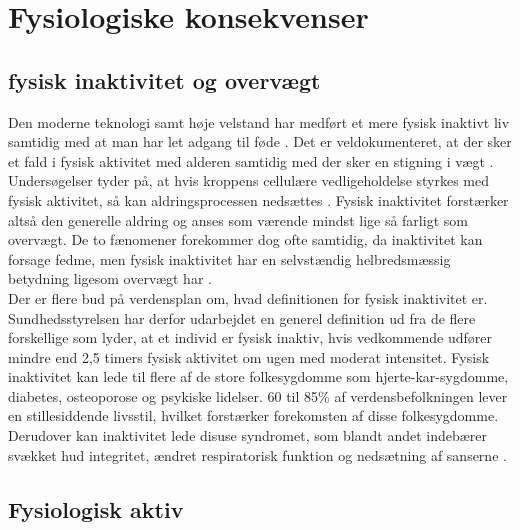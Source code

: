 \section{Fysiologiske konsekvenser}


\subsection{fysisk inaktivitet og overvægt}
Den moderne teknologi samt høje velstand har medført et mere fysisk inaktivt liv samtidig med at man har let adgang til føde \cite{Kiens2007}. Det er veldokumenteret, at der sker et fald i fysisk aktivitet med alderen samtidig med der sker en stigning i vægt \cite{Kaprio2008}. Undersøgelser tyder på, at hvis kroppens cellulære vedligeholdelse styrkes med fysisk aktivitet, så kan aldringsprocessen nedsættes \cite{Knight2012}. Fysisk inaktivitet forstærker altså den generelle aldring og anses som værende mindst lige så farligt som overvægt. De to fænomener forekommer dog ofte samtidig, da inaktivitet kan forsage fedme, men fysisk inaktivitet har en selvstændig helbredsmæssig betydning ligesom overvægt har \cite{Kiens2007,Kaprio2008,Hjort1997}.\\
Der er flere bud på verdensplan om, hvad definitionen for fysisk inaktivitet er. Sundhedsstyrelsen har derfor udarbejdet en generel definition ud fra de flere forskellige som lyder, at et individ er fysisk inaktiv, hvis vedkommende udfører mindre end 2,5 timers fysisk aktivitet om ugen med moderat intensitet. \cite{kiens2007} Fysisk inaktivitet kan lede til flere af de store folkesygdomme som hjerte-kar-sygdomme, diabetes, osteoporose og psykiske lidelser. 60 til 85\% af verdensbefolkningen lever en stillesiddende livsstil, hvilket forstærker forekomsten af disse folkesygdomme. \cite{kiens2007,Reshma2002april} Derudover kan inaktivitet lede disuse syndromet, som blandt andet indebærer svækket hud integritet, ændret respiratorisk funktion og nedsætning af sanserne \cite{Knight2012,Mosby2009}.\\


\cite{Knight2012}


\subsection{Fysiologisk aktiv}

